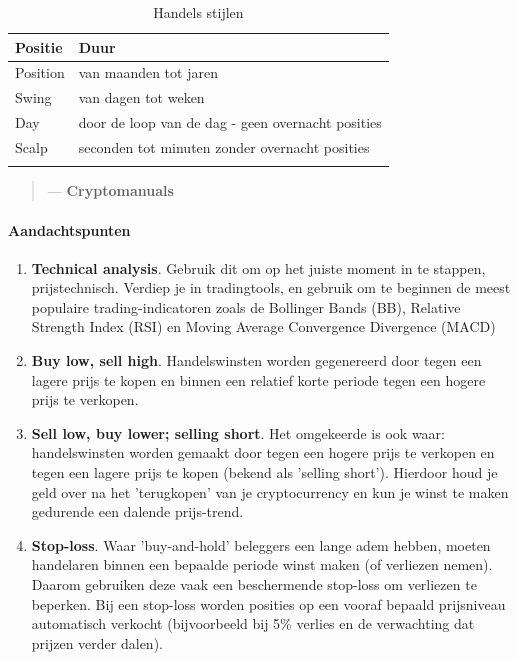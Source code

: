 \begin{table}[!htb]
\centering
\caption{Handels stijlen}
\begin{tabular}{ll}
\toprule
\textbf{Positie}         &   \textbf{Duur}                 \\
\midrule
                   
Position          &    van maanden tot jaren                  \\
Swing             &    van dagen tot weken             \\
Day               &    door de loop van de dag - geen overnacht posities \\
Scalp             &    seconden tot minuten zonder overnacht posities \\
\bottomrule                                     
\label{tab:tradertypes}
\end{tabular}
\end{table}

    \begin{quotation}
        \textit{}
            \begin{flushright}
                \small{--- \textbf{Cryptomanuals}}
            \end{flushright}
    \end{quotation}

\paragraph{Aandachtspunten} 

\begin{enumerate}[label=(\alph*)]
  \setlength\itemsep{0em}
    \item \textbf{Technical analysis}. Gebruik dit om op het juiste moment in te stappen, prijstechnisch. Verdiep je in tradingtools, en gebruik om te beginnen de meest populaire trading-indicatoren zoals de Bollinger Bands (BB), Relative Strength Index (RSI) en Moving Average Convergence Divergence (MACD) 
    \item \textbf{Buy low, sell high}. Handelswinsten worden gegenereerd door tegen een lagere prijs te kopen en binnen een relatief korte periode tegen een hogere prijs te verkopen.
    \item \textbf{Sell low, buy lower; selling short}. Het omgekeerde is ook waar: handelswinsten worden gemaakt door tegen een hogere prijs te verkopen en tegen een lagere prijs te kopen (bekend als 'selling short'). Hierdoor houd je geld over na het 'terugkopen' van je cryptocurrency en kun je winst te maken gedurende een dalende prijs-trend.
    \item \textbf{Stop-loss}. Waar 'buy-and-hold' beleggers een lange adem hebben, moeten handelaren binnen een bepaalde periode winst maken (of verliezen nemen). Daarom gebruiken deze vaak een beschermende stop-loss om verliezen te beperken. Bij een stop-loss worden posities op een vooraf bepaald prijsniveau automatisch verkocht (bijvoorbeeld bij 5\% verlies en de verwachting dat prijzen verder dalen). 
\end{enumerate}

